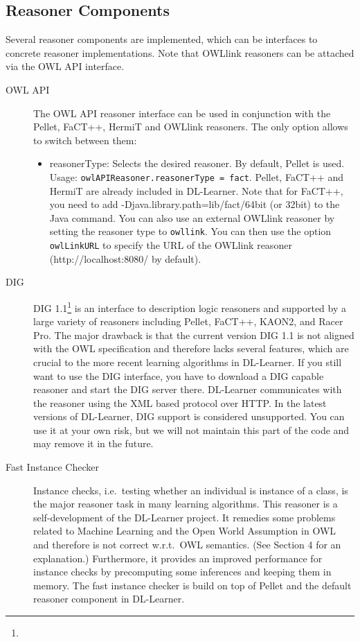 \documentclass[a4paper,12pt]{scrartcl}
\begin{document}
\subsection{Reasoner Components}

Several reasoner components are implemented, which can be interfaces to concrete reasoner implementations. 
Note that OWLlink reasoners can be attached via the OWL API interface.

\begin{description}
 \item[OWL API] The OWL API reasoner interface can be used in conjunction with the Pellet, FaCT++, HermiT and OWLlink reasoners. The only option allows to switch between them:
 \begin{itemize}
  \item reasonerType: Selects the desired reasoner. By default, Pellet is used. Usage: \verb|owlAPIReasoner.reasonerType = fact|. Pellet, FaCT++ and HermiT are already included in DL-Learner. Note that for FaCT++, you need to add -Djava.library.path=lib/fact/64bit (or 32bit) to the Java command. You can also use an external OWLlink reasoner by setting the reasoner type to \verb|owllink|. You can then use the option \verb|owlLinkURL| to specify the URL of the OWLlink reasoner (http://localhost:8080/ by default).
 \end{itemize}
 \item[DIG] DIG 1.1\footnote{\dig} is an interface to description logic reasoners and supported by a large variety of reasoners including Pellet, FaCT++, KAON2, and Racer Pro. The major drawback is that the current version DIG 1.1 is not aligned with the OWL specification and therefore lacks several features, which are crucial to the more recent learning algorithms in DL-Learner. If you still want to use the DIG interface, you have to download a DIG capable reasoner and start the DIG server there. DL-Learner communicates with the reasoner using the XML based protocol over HTTP. In the latest versions of DL-Learner, DIG support is considered unsupported. You can use it at your own risk, but we will not maintain this part of the code and may remove it in the future.
 \item[Fast Instance Checker] Instance checks, i.e.~testing whether an individual is instance of a class, is the major reasoner task in many learning algorithms. This reasoner is a self-development of the DL-Learner project. It remedies some problems related to Machine Learning and the Open World Assumption in OWL and therefore is not correct w.r.t.~OWL semantics. (See \cite{cheng00} Section 4 for an explanation.) Furthermore, it provides an improved performance for instance checks by precomputing some inferences and keeping them in memory. The fast instance checker is build on top of Pellet and the default reasoner component in DL-Learner.
\end{description}
\end{document}
